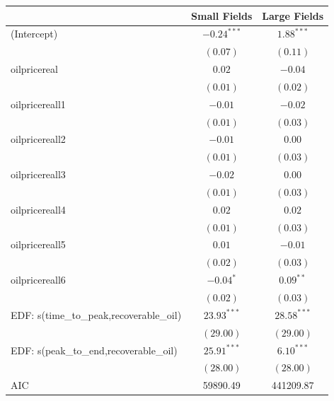 \documentclass[12pt]{article}
\begin{document}
\begin{table}[h]
\begin{center}
\begin{tabular}{l c c }
\hline
                                     & Small Fields & Large Fields \\
\hline
(Intercept)                          & $-0.24^{***}$ & $1.88^{***}$  \\
                                     & $(0.07)$      & $(0.11)$      \\
oilpricereal                       & $0.02$        & $-0.04$       \\
                                     & $(0.01)$      & $(0.02)$      \\
oilpricereall1                    & $-0.01$       & $-0.02$       \\
                                     & $(0.01)$      & $(0.03)$      \\
oilpricereall2                    & $-0.01$       & $0.00$        \\
                                     & $(0.01)$      & $(0.03)$      \\
oilpricereall3                    & $-0.02$       & $0.00$        \\
                                     & $(0.01)$      & $(0.03)$      \\
oilpricereall4                    & $0.02$        & $0.02$        \\
                                     & $(0.01)$      & $(0.03)$      \\
oilpricereall5                    & $0.01$        & $-0.01$       \\
                                     & $(0.02)$      & $(0.03)$      \\
oilpricereall6                    & $-0.04^{*}$   & $0.09^{**}$   \\
                                     & $(0.02)$      & $(0.03)$      \\
EDF: s(time_to_peak,recoverable_oil) & $23.93^{***}$ & $28.58^{***}$ \\
                                     & $(29.00)$     & $(29.00)$     \\
EDF: s(peak_to_end,recoverable_oil)  & $25.91^{***}$ & $6.10^{***}$  \\
                                     & $(28.00)$     & $(28.00)$     \\
\hline
AIC                                  & 59890.49      & 441209.87     \\

\end{tabular}
\end{center}
\end{table}
\end{document}
